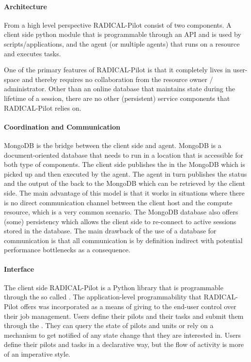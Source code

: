 \documentclass{sig-alternate}
\begin{document}
\paragraph{Architecture}

From a high level perspective RADICAL-Pilot consist of two components. A client
side python module that is programmable through an API and is used by
scripts/applications, and the agent (or multiple agents) that runs on a
resource and executes tasks.

One of the primary features of RADICAL-Pilot is that it completely lives in
user-space and thereby requires no collaboration from the resource owner /
administrator. Other than an online database that maintains state during the
lifetime of a session, there are no other (persistent) service components that
RADICAL-Pilot relies on.

\paragraph{Coordination and Communication}

MongoDB is the bridge between the client side and agent. MongoDB is a
document-oriented database that needs to run in a location that is accessible
for both type of components. The client side publishes the  in
the MongoDB which is picked up and then executed by the agent. The agent in
turn publishes the status and the output of the  back to
the MongoDB which can be retrieved by the client side. The main advantage of
this model is that it works in situations where there is no direct
communication channel between the client host and the compute resource, which
is a very common scenario. The MongoDB database also offers (some) persistency
which allows the client side to re-connect to active sessions stored in the
database. The main drawback of the use of a database for communication is that
all communication is by definition indirect with potential performance
bottlenecks as a consequence.

\paragraph{Interface}

The client side RADICAL-Pilot is a Python library that is programmable through
the so called . The application-level programmability that
RADICAL-Pilot offers was incorporated as a means of giving to the end-user
control over their job management. Users define their pilots and their tasks
and submit them through the . They can query the state of
pilots and units or rely on a  mechanism to get notified of
any state change that they are interested in. Users define their pilots and
tasks in a declarative way, but the flow of activity is more of an imperative
style.
\end{document}
